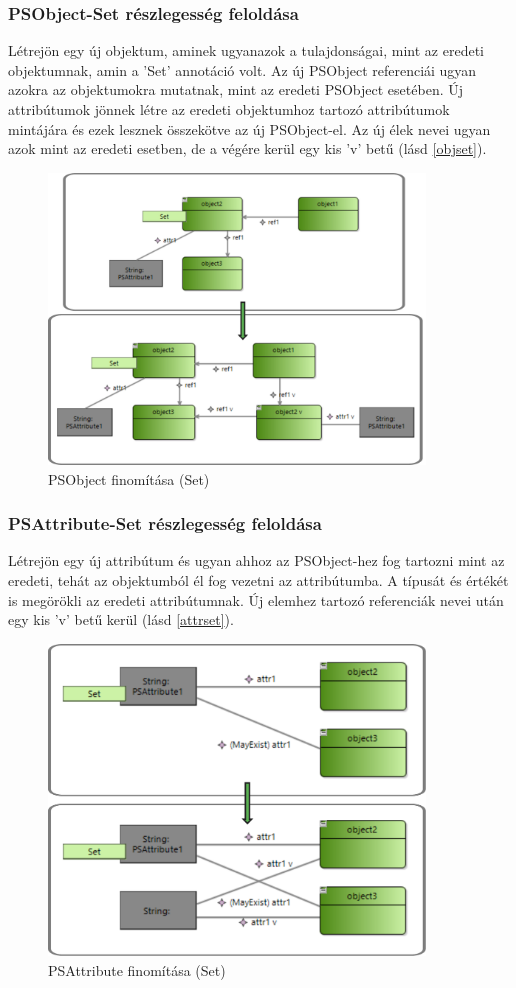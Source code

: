 \subsubsection{PSObject-Set részlegesség feloldása}
Létrejön egy új objektum, aminek ugyanazok a tulajdonságai, mint az eredeti objektumnak, amin a 'Set' annotáció volt. Az új PSObject referenciái ugyan azokra az objektumokra mutatnak, mint az eredeti PSObject esetében. Új attribútumok jönnek létre az eredeti objektumhoz tartozó attribútumok mintájára és ezek lesznek összekötve az új PSObject-el. Az új élek nevei ugyan azok mint az eredeti esetben, de a végére kerül egy kis 'v' betű (lásd \autoref{objset}).
\begin{figure}[!ht]
	\centering
	\includegraphics[width=100mm]{figures/objset.pdf}
	\caption{PSObject finomítása (Set)}
	\label{objset} 
\end{figure}

\subsubsection{PSAttribute-Set részlegesség feloldása}
Létrejön egy új attribútum és ugyan ahhoz az PSObject-hez fog tartozni mint az eredeti,  tehát az objektumból él fog vezetni az attribútumba. A típusát és értékét is megörökli az eredeti attribútumnak. Új elemhez tartozó referenciák nevei után egy kis 'v' betű kerül (lásd \autoref{attrset}).
\begin{figure}[!ht]
	\centering
	\includegraphics[width=100mm]{figures/attrset.pdf}
	\caption{PSAttribute finomítása (Set)}
	\label{attrset} 
\end{figure}

